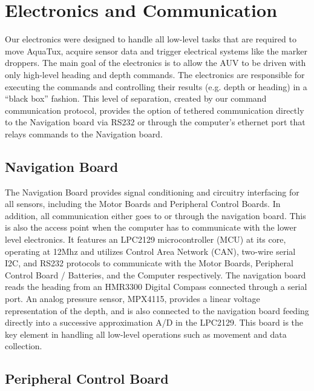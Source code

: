 
\section{Electronics and Communication}
Our electronics were designed to handle all low-level tasks that are
required to move AquaTux, acquire sensor data and trigger
electrical systems like the  marker droppers. The main goal
of the electronics is to allow the AUV to be driven with only
high-level heading and depth commands. The electronics are responsible for
executing the commands and controlling their results (e.g. depth or
heading) in a ``black box'' fashion. This level of separation, created by our command
communication protocol, provides the option of tethered communication directly to the Navigation board via RS232 or through the computer's ethernet port
that relays commands to the Navigation board.

\subsection{Navigation Board}
The Navigation Board provides signal conditioning and circuitry interfacing for all sensors, including the Motor Boards and Peripheral Control Boards. In addition, all communication either goes to or through the navigation board. This is also
the access point when the computer has to communicate with the lower level
electronics. It features an LPC2129 microcontroller (MCU) at its core, operating at
12Mhz and utilizes Control Area Network (CAN), two-wire serial I2C,
and RS232 protocols to communicate with the Motor Boards, Peripheral
Control Board / Batteries, and the Computer respectively. The
navigation board reads the heading from an HMR3300 Digital Compass
connected through a serial port.  An analog pressure sensor, MPX4115, provides a linear
voltage representation of the depth, and is also connected to the
navigation board feeding directly into a successive approximation A/D
in the LPC2129. This board is the key element in handling all low-level operations such as movement and data collection.

\subsection{Peripheral Control Board}


